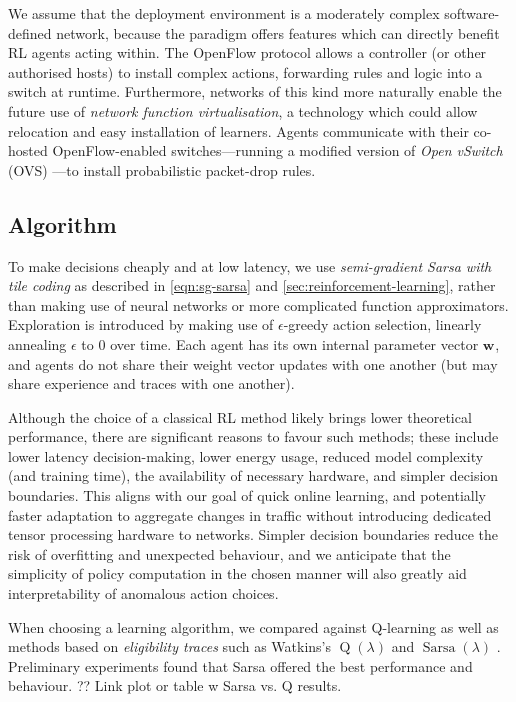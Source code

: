 \documentclass[10pt, times, conference, letterpaper]{IEEEtran}
\newcommand{\wvec}[1]{\ensuremath{\bm{w}_{#1}}}
\begin{document}
We assume that the deployment environment is a moderately complex software-defined network, because the paradigm offers features which can directly benefit RL agents acting within.
The OpenFlow protocol allows a controller (or other authorised hosts) to install complex actions, forwarding rules and logic into a switch at runtime.
Furthermore, networks of this kind more naturally enable the future use of \emph{network function virtualisation}, a technology which could allow relocation and easy installation of learners.
Agents communicate with their co-hosted OpenFlow-enabled switches---running a modified version of \emph{Open vSwitch} (OVS) \cite{open-vswitch}---to install probabilistic packet-drop rules.

\subsection{Algorithm}
To make decisions cheaply and at low latency, we use \emph{semi-gradient Sarsa with tile coding} as described in \cref{eqn:sg-sarsa} and \cref{sec:reinforcement-learning}, rather than making use of neural networks or more complicated function approximators.
Exploration is introduced by making use of $\epsilon$-greedy action selection, linearly annealing $\epsilon$ to 0 over time.
Each agent has its own internal parameter vector $\wvec{}$, and agents do not share their weight vector updates with one another (but may share experience and traces with one another).

Although the choice of a classical RL method likely brings lower theoretical performance, there are significant reasons to favour such methods; these include lower latency decision-making, lower energy usage, reduced model complexity (and training time), the availability of necessary hardware, and simpler decision boundaries.
This aligns with our goal of quick online learning, and potentially faster adaptation to aggregate changes in traffic without introducing dedicated tensor processing hardware to networks.
Simpler decision boundaries reduce the risk of overfitting and unexpected behaviour, and we anticipate that the simplicity of policy computation in the chosen manner will also greatly aid interpretability of anomalous action choices.

When choosing a learning algorithm, we compared against Q-learning as well as methods based on \emph{eligibility traces} such as Watkins's $\operatorname{Q}(\lambda)$ \cite[pp. 312--314]{RL2E} and $\operatorname{Sarsa}(\lambda)$ \cite[pp. 305]{RL2E}.
Preliminary experiments found that Sarsa offered the best performance and behaviour.
?? Link plot or table w Sarsa vs. Q results.
\end{document}
